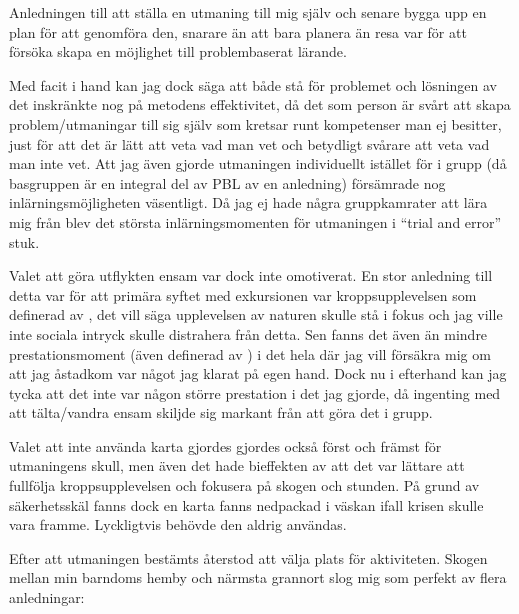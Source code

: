 \documentclass[12pt]{article}   %
\begin{document}
Anledningen till att ställa en utmaning till mig själv och senare bygga upp en plan
för att genomföra den, snarare än att bara planera än resa var för att försöka
skapa en möjlighet till problembaserat lärande.

Med facit i hand kan jag dock säga att
både stå för problemet och lösningen av det inskränkte nog på metodens effektivitet, då det som
person är svårt att skapa problem/utmaningar till sig själv som kretsar
runt kompetenser man ej besitter, just för att det är lätt att veta vad man vet
och betydligt svårare att veta vad man inte vet. Att jag även gjorde utmaningen individuellt
istället för i grupp (då basgruppen är en integral del av PBL\cite{silen2004} av en anledning)
försämrade nog inlärningsmöjligheten väsentligt. Då jag ej hade några gruppkamrater
att lära mig från blev det största inlärningsmomenten för utmaningen i ``trial and error'' stuk.

Valet att göra utflykten ensam var dock inte omotiverat. En stor anledning till detta
var för att primära syftet med exkursionen var kroppsupplevelsen som definerad av \cite{sandell2011friluftssport},
det vill säga upplevelsen av naturen skulle stå i fokus och jag ville
inte sociala intryck skulle distrahera från detta. Sen fanns det även
än mindre prestationsmoment (även definerad av \cite{sandell2011friluftssport})
i det hela där jag vill försäkra mig om att jag åstadkom var något jag klarat
på egen hand. Dock nu i efterhand kan jag tycka att det inte var någon större prestation
i det jag gjorde, då ingenting med att tälta/vandra ensam skiljde sig markant från
att göra det i grupp.

Valet att inte använda karta gjordes gjordes också först och främst för utmaningens skull,
men även det hade bieffekten av att det var lättare att fullfölja kroppsupplevelsen och
fokusera på skogen och stunden\cite{loynes2020}. På grund av säkerhetsskäl fanns dock en karta
fanns nedpackad i väskan ifall krisen skulle vara framme. Lyckligtvis behövde den aldrig användas.

Efter att utmaningen bestämts återstod att välja plats för aktiviteten. Skogen mellan
min barndoms hemby och närmsta grannort slog mig som perfekt av flera anledningar:
\end{document}
